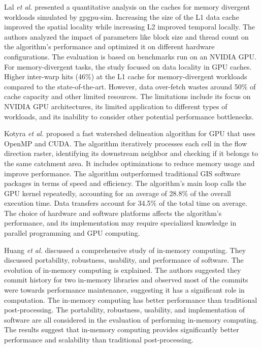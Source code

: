 \documentclass[journal, a4paper]{IEEEtran}
\begin{document}
	Lal \textit{et al.} \cite{10.1007/978-3-030-60939-9_16} presented a quantitative analysis on the caches for memory divergent workloads simulated by gpgpu-sim. Increasing the size of the L1 data cache improved the spatial locality while increasing L2 improved temporal locally. The authors analyzed the impact of parameters like block size and thread count on the algorithm's performance and optimized it on different hardware configurations. The evaluation is based on benchmarks run on an NVIDIA GPU. For memory-divergent tasks, the study focused on data locality in GPU caches. Higher inter-warp hits (46\%) at the L1 cache for memory-divergent workloads compared to the state-of-the-art. However, data over-fetch wastes around 50\% of cache capacity and other limited resources. The limitations include its focus on NVIDIA GPU architectures, its limited application to different types of workloads, and its inability to consider other potential performance bottlenecks.
	
	Kotyra \textit{et al.} \cite{KOTYRA2023105613} proposed a fast watershed delineation algorithm for GPU that uses OpenMP and CUDA. The algorithm iteratively processes each cell in the flow direction raster, identifying its downstream neighbor and checking if it belongs to the same catchment area. It includes optimizations to reduce memory usage and improve performance. The algorithm outperformed traditional GIS software packages in terms of speed and efficiency. The algorithm's main loop calls the GPU kernel repeatedly, accounting for an average of 28.8\% of the overall execution time. Data transfers account for 34.5\% of the total time on average. The choice of hardware and software platforms affects the algorithm's performance, and its implementation may require specialized knowledge in parallel programming and GPU computing.
	
	Huang \textit{et al.} \cite{HUANG2022106} discussed a comprehensive study of in-memory computing.	They discussed portability, robustness, usability, and performance of software. The evolution of in-memory computing is explained. The authors suggested they commit history for two in-memory libraries and observed most of the commits	were towards performance maintenance, suggesting it has a significant role in computation. The in-memory computing has better performance than traditional post-processing. The portability, robustness, usability, and implementation of software are all considered in the evaluation of performing in-memory computing. The results suggest that in-memory computing provides significantly better performance and scalability than traditional post-processing.
	
	
	
	
	
	
\end{document}
